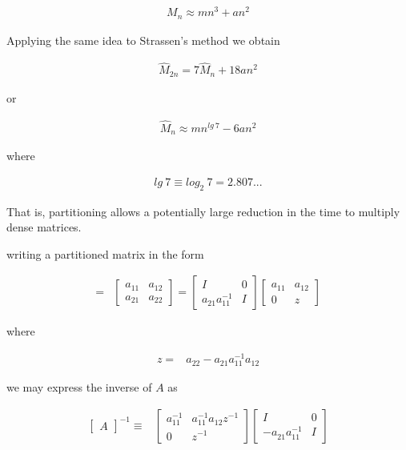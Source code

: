 \begin{align}
    M_{n} \approx mn^{3} + an^{2}
\end{align}

Applying the same idea to Strassen’s method we obtain

\begin{align}
    \hat{M}_{2n} = 7\hat{M}_{n} + 18an^{2}
\end{align}

or

\begin{align}
    \hat{M}_{n} \approx mn^{lg\ 7} - 6an^{2}
\end{align}

where

\begin{align*}
    lg\ 7 \equiv log_{2}\ 7 = 2.807...
\end{align*}

That is, partitioning allows a potentially large reduction in the time to multiply dense matrices.

 writing a partitioned matrix in the form

\begin{align}
    [A]                     =& 
    \begin{bmatrix}
      a_{11} & a_{12} \\
      a_{21} & a_{22}
    \end{bmatrix}
    =
    \begin{bmatrix}
      I                 & 0 \\
      a_{21}^{}a_{11}^{-1} & I
    \end{bmatrix}
    \begin{bmatrix}
      a_{11} & a_{12} \\
      0      & z
    \end{bmatrix}
\end{align}

where

\begin{align}
    z =& a_{22} - a_{21}a_{11}^{-1}a_{12}
\end{align}

we may express the inverse of $A$ as

\begin{align}
    \begin{bmatrix}
      A
    \end{bmatrix}^{-1} \equiv&
    \begin{bmatrix}
      a_{11}^{-1} & a_{11}^{-1}a_{12}^{}z^{-1} \\
      0           & z^{-1}
    \end{bmatrix}
    \begin{bmatrix}
      I                     & 0 \\
      -a_{21}^{}a_{11}^{-1} & I
    \end{bmatrix}
\end{align}


